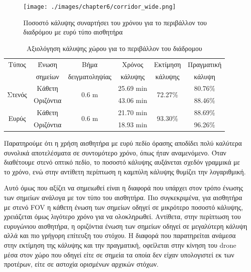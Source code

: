 \begin{figure}[!ht]
    \texttt{[image: ./images/chapter6/corridor\_wide.png]}
    \caption{Ποσοστό κάλυψης συναρτήσει του χρόνου για το περιβάλλον του διαδρόμου με ευρύ τύπο αισθητήρα}
     \label{fig:corridor_wide}
\end{figure} 

\begin{table}[!ht]
    \begin{center}
        \caption{Αξιολόγηση κάλυψης χώρου για το περιβάλλον του διάδρομου}
        \label{tab:coverage_corridor}
        \begin{tabular}{ | c | c | c | c | c | c |}
        \hline
        \rowcolor{Gray}
        Τύπος                   & Ένωση     & Βήμα                        & Χρόνος         & Εκτίμηση                 & Πραγματική \\
        \rowcolor{Gray}
                                & σημείων   & δειγματοληψίας              & κάλυψης        & κάλυψης                  & κάλυψη     \\
        \hline
        \multirow{2}{*}{Στενός} & Κάθετη    & \multirow{2}{*}{0.6 \si{m}} & 25.69 \si{min} & \multirow{2}{*}{72.27\%} & 80.76\%    \\
        \cline{2-2}\cline{4-4}\cline{6-6}
                                & Οριζόντια &                             & 43.06 \si{min} &                          & 88.46\%    \\
        \hline
        \multirow{2}{*}{Ευρύς} & Κάθετη     & \multirow{2}{*}{0.6 \si{m}} & 21.70 \si{min} & \multirow{2}{*}{93.30\%} & 88.69\%    \\
        \cline{2-2}\cline{4-4}\cline{6-6}
                               & Οριζόντια  &                             & 18.93 \si{min} &                          & 96.26\%    \\
        \hline
        \end{tabular}
    \end{center}
\end{table}

Παρατηρούμε ότι η χρήση αισθητήρα με ευρύ πεδίο όρασης αποδίδει πολύ καλύτερα συνολικά αποτελέσματα σε συντομότερο χρόνο, όπως ήταν αναμενόμενο. Όταν διαθέτουμε στενό οπτικό πεδίο, το ποσοστό κάλυψης αυξάνεται σχεδόν γραμμικά με το χρόνο, ενώ στην αντίθετη περίπτωση η καμπύλη κάλυψης θυμίζει την λογαριθμική.
    
Αυτό όμως που αξίζει να σημειωθεί είναι η διαφορά που υπάρχει στον τρόπο ένωσης των σημείων ανάλογα με τον τύπο του αισθητήρα. Πιο συγκεκριμένα, για αισθητήρα με στενό FOV η κάθετη ένωση των σημείων οδηγεί σε μικρότερο ποσοστό κάλυψης, χρειάζεται όμως λιγότερο χρόνο για να ολοκληρωθεί. Αντίθετα, στην περίπτωση του ευρυγώνιου αισθητήρα, η οριζόντια ένωση των σημείων οδηγεί σε μεγαλύτερη κάλυψη αλλά και πιο γρήγορη επίτευξη του στόχου. Η διαφορά που παρατηρείται ανάμεσα στην εκτίμηση της κάλυψης και την πραγματική, οφείλεται στην κίνηση του drone μέσα στον χώρο που οδηγεί είτε σε σημεία τα οποία δεν είχαν υπολογιστεί εκ των προτέρων, είτε σε αστοχία ορισμένων αρχικών στόχων.

